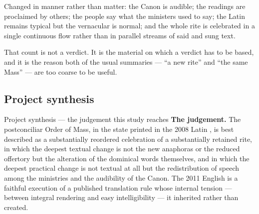 Changed in manner rather than matter: the Canon is audible; the readings are proclaimed by
others; the people say what the ministers used to say; the Latin remains typical but the
vernacular is normal; and the whole rite is celebrated in a single continuous flow rather than in
parallel streams of said and sung text.

That count is not a verdict. It is the material on which a verdict has to be based, and it is
the reason both of the usual summaries --- ``a new rite'' and ``the same Mass'' --- are too
coarse to be useful.

\subsection{Project synthesis}

\begin{studybox}{Project synthesis --- the judgement this study reaches}
\textbf{The judgement.} The postconciliar Order of Mass, in the state printed in the 2008 Latin
, is best described as a substantially reordered
celebration of a substantially retained rite, in which the deepest textual change is not the
new anaphoras or the reduced offertory but the alteration of the dominical words themselves,
and in which the deepest practical change is not textual at all but the redistribution of
speech among the ministries and the audibility of the Canon. The 2011 English is a faithful
execution of a published translation rule whose internal tension --- between integral rendering
and easy intelligibility --- it inherited rather than created.


\end{studybox}
